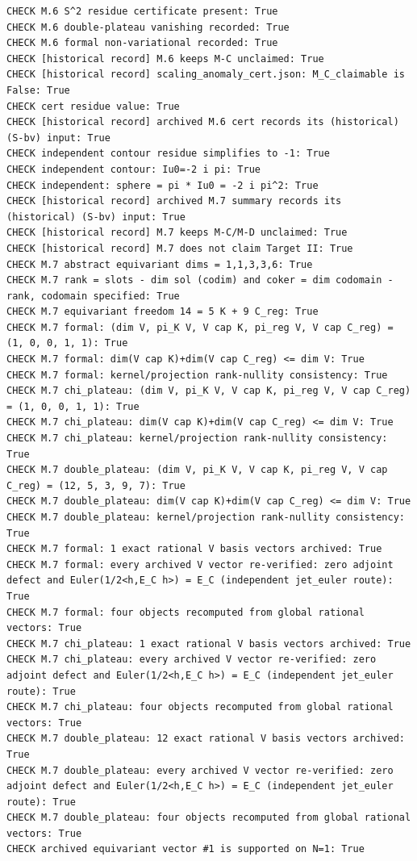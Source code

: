 \documentclass{article}
\theoremstyle{remark}
\begin{document}
\begin{lstlisting}
CHECK M.6 S^2 residue certificate present: True
CHECK M.6 double-plateau vanishing recorded: True
CHECK M.6 formal non-variational recorded: True
CHECK [historical record] M.6 keeps M-C unclaimed: True
CHECK [historical record] scaling_anomaly_cert.json: M_C_claimable is False: True
CHECK cert residue value: True
CHECK [historical record] archived M.6 cert records its (historical) (S-bv) input: True
CHECK independent contour residue simplifies to -1: True
CHECK independent contour: Iu0=-2 i pi: True
CHECK independent: sphere = pi * Iu0 = -2 i pi^2: True
CHECK [historical record] archived M.7 summary records its (historical) (S-bv) input: True
CHECK [historical record] M.7 keeps M-C/M-D unclaimed: True
CHECK [historical record] M.7 does not claim Target II: True
CHECK M.7 abstract equivariant dims = 1,1,3,3,6: True
CHECK M.7 rank = slots - dim sol (codim) and coker = dim codomain - rank, codomain specified: True
CHECK M.7 equivariant freedom 14 = 5 K + 9 C_reg: True
CHECK M.7 formal: (dim V, pi_K V, V cap K, pi_reg V, V cap C_reg) = (1, 0, 0, 1, 1): True
CHECK M.7 formal: dim(V cap K)+dim(V cap C_reg) <= dim V: True
CHECK M.7 formal: kernel/projection rank-nullity consistency: True
CHECK M.7 chi_plateau: (dim V, pi_K V, V cap K, pi_reg V, V cap C_reg) = (1, 0, 0, 1, 1): True
CHECK M.7 chi_plateau: dim(V cap K)+dim(V cap C_reg) <= dim V: True
CHECK M.7 chi_plateau: kernel/projection rank-nullity consistency: True
CHECK M.7 double_plateau: (dim V, pi_K V, V cap K, pi_reg V, V cap C_reg) = (12, 5, 3, 9, 7): True
CHECK M.7 double_plateau: dim(V cap K)+dim(V cap C_reg) <= dim V: True
CHECK M.7 double_plateau: kernel/projection rank-nullity consistency: True
CHECK M.7 formal: 1 exact rational V basis vectors archived: True
CHECK M.7 formal: every archived V vector re-verified: zero adjoint defect and Euler(1/2<h,E_C h>) = E_C (independent jet_euler route): True
CHECK M.7 formal: four objects recomputed from global rational vectors: True
CHECK M.7 chi_plateau: 1 exact rational V basis vectors archived: True
CHECK M.7 chi_plateau: every archived V vector re-verified: zero adjoint defect and Euler(1/2<h,E_C h>) = E_C (independent jet_euler route): True
CHECK M.7 chi_plateau: four objects recomputed from global rational vectors: True
CHECK M.7 double_plateau: 12 exact rational V basis vectors archived: True
CHECK M.7 double_plateau: every archived V vector re-verified: zero adjoint defect and Euler(1/2<h,E_C h>) = E_C (independent jet_euler route): True
CHECK M.7 double_plateau: four objects recomputed from global rational vectors: True
CHECK archived equivariant vector #1 is supported on N=1: True

\end{lstlisting}
\end{document}
